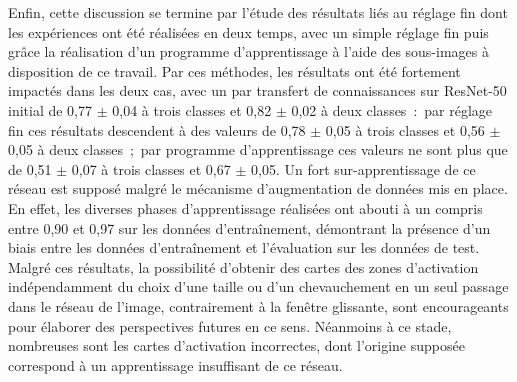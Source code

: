 Enfin, cette discussion se termine par l'étude des résultats liés au réglage fin dont les expériences ont été réalisées en deux temps, avec un simple réglage fin puis grâce la réalisation d'un programme d'apprentissage à l'aide des sous-images à disposition de ce travail. Par ces méthodes, les résultats ont été fortement impactés dans les deux cas, avec un \fscore{} par transfert de connaissances sur ResNet-50 initial de 0,77 $\pm$ 0,04 à trois classes et 0,82 $\pm$ 0,02 à deux classes~:~par réglage fin ces résultats descendent à des valeurs de 0,78 $\pm$ 0,05 à trois classes et 0,56 $\pm$ 0,05 à deux classes~;~par programme d'apprentissage ces valeurs ne sont plus que de 0,51 $\pm$ 0,07 à trois classes et 0,67 $\pm$ 0,05. Un fort sur-apprentissage de ce réseau est supposé malgré le mécanisme d'augmentation de données mis en place. En effet, les diverses phases d'apprentissage réalisées ont abouti à un \fscore{} compris entre 0,90 et 0,97 sur les données d'entraînement, démontrant la présence d'un biais entre les données d'entraînement et l'évaluation sur les données de test. Malgré ces résultats, la possibilité d'obtenir des cartes des zones d'activation indépendamment du choix d'une taille ou d'un chevauchement en un seul passage dans le réseau de l'image, contrairement à la fenêtre glissante, sont encourageants pour élaborer des perspectives futures en ce sens. Néanmoins à ce stade, nombreuses sont les cartes d'activation incorrectes, dont l'origine supposée correspond à un apprentissage insuffisant de ce réseau.\par